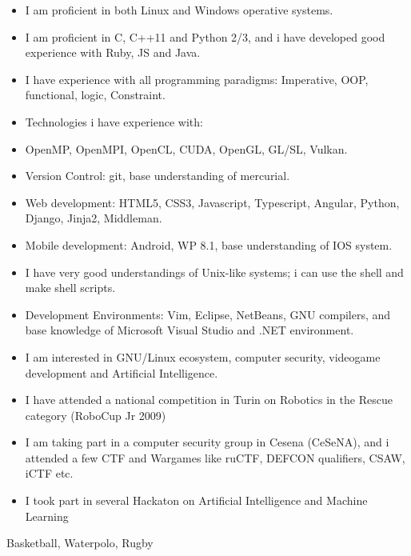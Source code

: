 \documentclass[helvetica,narrow,openbib,notitle,flagCMYK]{europecv}
\begin{document}
\begin{europecv}
	 {
		\begin{itemize}
			\item I am proficient in both Linux and Windows operative systems.
			\item I am proficient in C, C++11 and Python 2/3, and i have developed good experience with Ruby, JS and Java.
			\item I have experience with all programming paradigms: Imperative, OOP, functional, logic, Constraint.
			\item Technologies i have experience with:
			\item OpenMP, OpenMPI, OpenCL, CUDA, OpenGL, GL/SL, Vulkan.
			\item Version Control: git, base understanding of mercurial.
			\item Web development: HTML5, CSS3, Javascript, Typescript, Angular, Python, Django, Jinja2, Middleman.
			\item Mobile development: Android, WP 8.1, base understanding of IOS system.
			\item I have very good understandings of Unix-like systems; i can use the shell and make shell scripts.
			\item Development Environments: Vim, Eclipse, NetBeans, GNU compilers, and base knowledge of Microsoft Visual Studio and .NET environment.
		\end{itemize}
	}
	 {
		\begin{itemize}
			\item I am interested in GNU/Linux ecosystem, computer security, videogame development and Artificial Intelligence. 
			\item I have attended a national competition in Turin on Robotics in the Rescue category (RoboCup Jr 2009) 
			\item I am taking part in a computer security group in Cesena (CeSeNA), and i attended a few CTF and Wargames like ruCTF, DEFCON qualifiers, CSAW, iCTF etc.
			\item I took part in several Hackaton on Artificial Intelligence and Machine Learning
		\end{itemize}
	}
	 {Basketball, Waterpolo, Rugby}


	\end{europecv}
\end{document}
